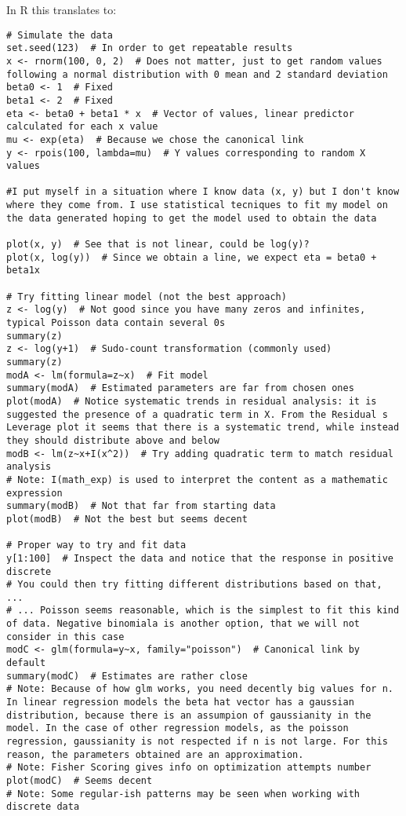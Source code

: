 In R this translates to:
\begin{verbatim}
# Simulate the data
set.seed(123)  # In order to get repeatable results
x <- rnorm(100, 0, 2)  # Does not matter, just to get random values following a normal distribution with 0 mean and 2 standard deviation
beta0 <- 1  # Fixed
beta1 <- 2  # Fixed
eta <- beta0 + beta1 * x  # Vector of values, linear predictor calculated for each x value
mu <- exp(eta)  # Because we chose the canonical link
y <- rpois(100, lambda=mu)  # Y values corresponding to random X values 

#I put myself in a situation where I know data (x, y) but I don't know where they come from. I use statistical tecniques to fit my model on the data generated hoping to get the model used to obtain the data

plot(x, y)  # See that is not linear, could be log(y)?
plot(x, log(y))  # Since we obtain a line, we expect eta = beta0 + beta1x

# Try fitting linear model (not the best approach)
z <- log(y)  # Not good since you have many zeros and infinites, typical Poisson data contain several 0s
summary(z)  
z <- log(y+1)  # Sudo-count transformation (commonly used)
summary(z)
modA <- lm(formula=z~x)  # Fit model
summary(modA)  # Estimated parameters are far from chosen ones
plot(modA)  # Notice systematic trends in residual analysis: it is suggested the presence of a quadratic term in X. From the Residual s Leverage plot it seems that there is a systematic trend, while instead they should distribute above and below
modB <- lm(z~x+I(x^2))  # Try adding quadratic term to match residual analysis
# Note: I(math_exp) is used to interpret the content as a mathematic expression
summary(modB)  # Not that far from starting data
plot(modB)  # Not the best but seems decent

# Proper way to try and fit data
y[1:100]  # Inspect the data and notice that the response in positive discrete
# You could then try fitting different distributions based on that, ...
# ... Poisson seems reasonable, which is the simplest to fit this kind of data. Negative binomiala is another option, that we will not consider in this case
modC <- glm(formula=y~x, family="poisson")  # Canonical link by default
summary(modC)  # Estimates are rather close
# Note: Because of how glm works, you need decently big values for n. In linear regression models the beta hat vector has a gaussian distribution, because there is an assumpion of gaussianity in the model. In the case of other regression models, as the poisson regression, gaussianity is not respected if n is not large. For this reason, the parameters obtained are an approximation.
# Note: Fisher Scoring gives info on optimization attempts number
plot(modC)  # Seems decent
# Note: Some regular-ish patterns may be seen when working with discrete data


\end{verbatim}
